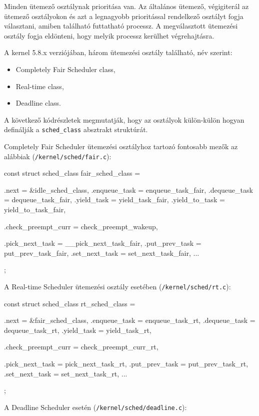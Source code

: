 Minden ütemező osztálynak prioritása van. 
Az általános ütemező, végigiterál az ütemező osztályokon és azt a legnagyobb prioritással rendelkező osztályt fogja választani, amiben található futtatható processz. A megválasztott ütemezési osztály fogja eldönteni, hogy melyik processz kerülhet végrehajtásra.

A kernel 5.8.x verziójában, három ütemezési osztály található, név szerint: 
\begin{itemize}
	 \item Completely Fair Scheduler class,
	 \item Real-time class,
	 \item Deadline class.
\end{itemize}
A következő kódrészletek megmutatják, hogy az osztályok külön-külön hogyan definálják a \texttt{sched\_class} absztrakt struktúrát.

Completely Fair Scheduler ütemezési osztályhoz tartozó fontosabb mezők az alábbiak (\texttt{/kernel/sched/fair.c}):

\begin{cpp}
const struct sched_class fair_sched_class = {
	.next			= &idle_sched_class,
	.enqueue_task		= enqueue_task_fair,
	.dequeue_task		= dequeue_task_fair,
	.yield_task		= yield_task_fair,
	.yield_to_task		= yield_to_task_fair,

	.check_preempt_curr	= check_preempt_wakeup,

	.pick_next_task		= __pick_next_task_fair,
	.put_prev_task		= put_prev_task_fair,
	.set_next_task          = set_next_task_fair,
...
};
\end{cpp}

A Real-time Scheduler ütemezési osztály esetében (\texttt{/kernel/sched/rt.c}):

\begin{cpp}
const struct sched_class rt_sched_class = {
	.next			= &fair_sched_class,
	.enqueue_task		= enqueue_task_rt,
	.dequeue_task		= dequeue_task_rt,
	.yield_task		= yield_task_rt,

	.check_preempt_curr	= check_preempt_curr_rt,

	.pick_next_task		= pick_next_task_rt,
	.put_prev_task		= put_prev_task_rt,
	.set_next_task          = set_next_task_rt,
...
};
\end{cpp}

A Deadline Scheduler esetén (\texttt{/kernel/sched/deadline.c}):

